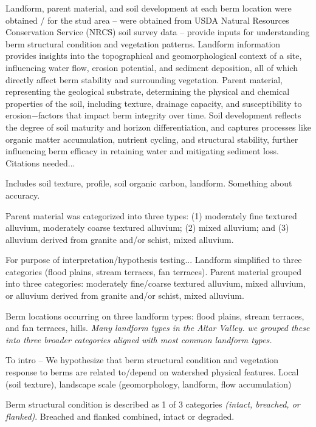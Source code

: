 \documentclass[review]{elsarticle}
\begin{document}
Landform, parent material, and soil development  at each berm location were obtained / for the stud area -- were obtained   from USDA Natural Resources Conservation Service (NRCS) soil survey data -- provide  inputs for understanding berm structural condition and vegetation patterns.
Landform information provides insights into the topographical and geomorphological context of a site, influencing water flow, erosion potential, and sediment deposition, all of which directly affect berm stability and surrounding vegetation. 
Parent material, representing the geological substrate, determining the physical and chemical properties of the soil, including texture, drainage capacity, and susceptibility to erosion$-$factors that impact berm integrity over time. 
Soil development reflects the degree of soil maturity and horizon differentiation, and captures processes like organic matter accumulation, nutrient cycling, and structural stability, further influencing berm efficacy in retaining water and mitigating sediment loss.
Citations needed... 

Includes soil texture, profile, soil organic carbon, landform.
Something about accuracy. 

Parent material was categorized into three  types: (1) moderately fine textured alluvium, moderately coarse textured alluvium; (2) mixed alluvium; and (3) alluvium derived from granite and/or schist, mixed alluvium. 


For purpose of interpretation/hypothesis testing... 
Landform simplified to three categories (flood plains, stream terraces, fan terraces). 
Parent material grouped into three categories: moderately fine/coarse textured alluvium, mixed alluvium, or alluvium derived from granite and/or schist, mixed alluvium.

Berm locations occurring on three landform types: flood plains, stream terraces, and fan terraces, hills. 
\textit{Many landform types in the Altar Valley. we grouped these into three broader categories aligned with most common landform types.}



To intro – We hypothesize that berm structural condition and  vegetation response to berms are related to/depend on watershed physical features.  Local (soil texture), landscape scale (geomorphology, landform, flow accumulation)

Berm structural condition is described as 1 of 3 categories \textit{(intact, breached, or flanked)}. Breached and flanked combined, intact or degraded.  
\end{document}
